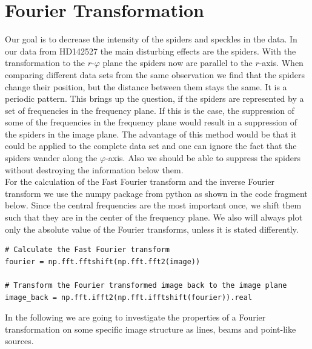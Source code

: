 \section{Fourier Transformation}
Our goal is to decrease the intensity of the spiders and speckles in the data. In our data from HD142527 the main disturbing effects are the spiders. With the transformation to the $r$-$\varphi$ plane the spiders now are parallel to the $r$-axis. When comparing different data sets from the same observation we find that the spiders change their position, but the distance between them stays the same. It is a periodic pattern. This brings up the question, if the spiders are represented by a set of frequencies in the frequency plane. If this is the case, the suppression of some of the frequencies in the frequency plane would result in a suppression of the spiders in the image plane. The advantage of this method would be that it could be applied to the complete data set and one can ignore the fact that the spiders wander along the $\varphi$-axis. Also we should be able to suppress the spiders without destroying the information below them.\\
For the calculation of the Fast Fourier transform and the inverse Fourier transform we use the numpy package from python as shown in the code fragment below. Since the central frequencies are the most important once, we shift them such that they are in the center of the frequency plane. We also will always plot only the absolute value of the Fourier transforms, unless it is stated differently. 
\lstset{language=Python, numbers = none}
\begin{lstlisting}[frame=lines]
# Calculate the Fast Fourier transform
fourier = np.fft.fftshift(np.fft.fft2(image))

# Transform the Fourier transformed image back to the image plane
image_back = np.fft.ifft2(np.fft.ifftshift(fourier)).real
\end{lstlisting}
In the following we are going to investigate the properties of a Fourier transformation on some specific image structure as lines, beams and point-like sources.\\

